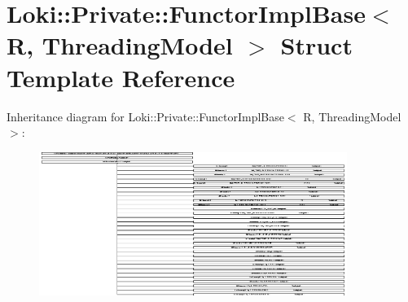 \hypertarget{structLoki_1_1Private_1_1FunctorImplBase}{}\section{Loki\+:\+:Private\+:\+:Functor\+Impl\+Base$<$ R, Threading\+Model $>$ Struct Template Reference}
\label{structLoki_1_1Private_1_1FunctorImplBase}
Inheritance diagram for Loki\+:\+:Private\+:\+:Functor\+Impl\+Base$<$ R, Threading\+Model $>$\+:\begin{figure}[H]
\begin{center}
\leavevmode
\includegraphics[height=4.664380cm]{structLoki_1_1Private_1_1FunctorImplBase}
\end{center}
\end{figure}
